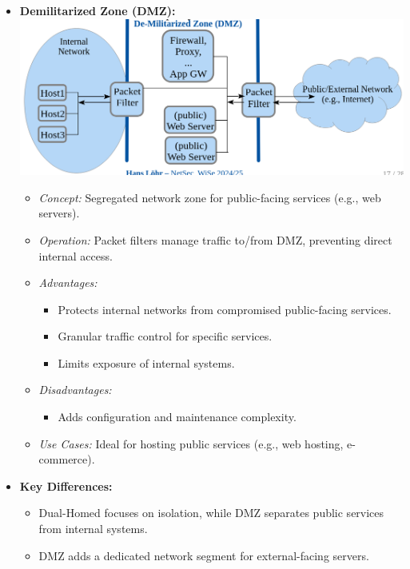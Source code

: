 \begin{itemize}
    \item \textbf{Demilitarized Zone (DMZ):}\\
    \includegraphics[width=0.8\columnwidth]{Resources/dmz.png} 
    \begin{itemize}
        \item \textit{Concept:} Segregated network zone for public-facing services (e.g., web servers).
        \item \textit{Operation:} Packet filters manage traffic to/from DMZ, preventing direct internal access.
        \item \textit{Advantages:}
        \begin{itemize}
            \item Protects internal networks from compromised public-facing services.
            \item Granular traffic control for specific services.
            \item Limits exposure of internal systems.
        \end{itemize}
        \item \textit{Disadvantages:}
        \begin{itemize}
            \item Adds configuration and maintenance complexity.
        \end{itemize}
        \item \textit{Use Cases:} Ideal for hosting public services (e.g., web hosting, e-commerce).
    \end{itemize}

    \item \textbf{Key Differences:}
    \begin{itemize}
        \item Dual-Homed focuses on isolation, while DMZ separates public services from internal systems.
        \item DMZ adds a dedicated network segment for external-facing servers.
    \end{itemize}
\end{itemize}

